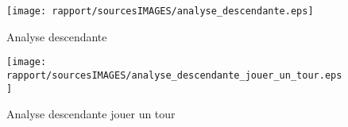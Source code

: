 \begin{figure}[ht]
  \centering
  \texttt{[image: rapport/sourcesIMAGES/analyse\_descendante.eps]}
  \caption{Analyse descendante}
  \texttt{[image: rapport/sourcesIMAGES/analyse\_descendante\_jouer\_un\_tour.eps]}

  \caption{Analyse descendante jouer un tour}
\end{figure}
